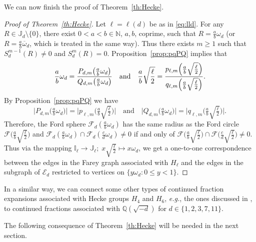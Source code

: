 \documentclass[graybox]{svmult}
\begin{document}
We can now finish the proof of Theorem~\ref{th:Hecke}.

\begin{proof}[Proof of Theorem~\ref{th:Hecke}]
Let $\ell=\ell(d)$ be as in \eqref{eq:lld}. For any $R \in \mathbb J_{d} \setminus \{0\}$, there exist $0 < a < b \in \mathbb N$, $a, b$, coprime, such that $R = \tfrac{a}{b} \omega_d$ (or $R = \tfrac{a}{b}\overline\omega_d$, which is treated in the same way).  Thus there exists $m\ge 1$ such that $S_{d}^{m-1}(R) \ne 0$ and $S_{d}^{m}(R) = 0$.  Proposition~\ref{prop:pqPQ} implies that 
\[
\frac{a}{b} \omega_d  = \frac{P_{d,m}\big(\tfrac{a}{b} \omega_d\big)}{Q_{d,m}\big(\tfrac{a}{b} \omega_d\big)} \quad \hbox{and}\quad 
\frac{a}{b}\sqrt{\frac\ell2} = \frac{p_{\ell,m}\Big(\tfrac{a}{b} \sqrt{\tfrac\ell2}\Big) }{q_{\ell,m}\Big(\tfrac{a}{b} \sqrt{\tfrac\ell2}\Big) }. 
\]
By  Proposition~\ref{prop:pqPQ} we have 
\[
\big|P_{d,m}\big(\tfrac{a}{b} \omega_d\big)\big|=\Big|p_{\ell,m}\Big(\tfrac{a}{b} \sqrt{\tfrac\ell2}\Big)\Big| \quad\text{and}\quad \big|Q_{d,m}\big(\tfrac{a}{b} \omega_d\big)\big|=\Big|q_{\ell,m}\Big(\tfrac{a}{b} \sqrt{\tfrac\ell2}\Big)\Big|.
\]
Therefore, the Ford sphere $\mathcal{F}_{d}\left(\tfrac{a}{b} \omega_d\right)$ has the same radius as the Ford circle $\mathcal{F}\Big(\tfrac{a}{b}\sqrt{\tfrac\ell2}\Big)$  and $\mathcal{F}_{d}\left(\tfrac{a}{b} \omega_d\right) \cap \mathcal{F}_{d}\left(\tfrac{c}{d} \omega_d\right)\not=0$ if and only of $\mathcal{F}\Big(\tfrac{a}{b}\sqrt{\tfrac\ell2}\Big) \cap \mathcal{F}\Big(\tfrac{c}{d}\sqrt{\tfrac\ell2}\Big) \not=0$. Thus via the mapping $\mathbb I_{\ell} \to \mathbb J_\ell;  \; x \sqrt{\tfrac{\ell}{2}} \mapsto x \omega_{d}$, we get a one-to-one correspondence between the edges in the Farey graph associated with $H_\ell$ and the edges in the subgraph of $\mathcal E_{d}$ restricted to vertices on $\{y\omega_{d} : 0 \le y <1\}$.  
\end{proof}

In a similar way, we can connect some other types of continued fraction 
expansions associated with Hecke groups $H_{4}$ and $H_{6}$, {\em e.g.}, the ones discussed in 
\cite{D-K-S,K-S-S,R}, to continued fractions associated with $\mathbb Q(\sqrt{-d})$ for $d\in\{1, 2, 3, 7, 11\}$. 


The following consequence of Theorem~\ref{th:Hecke} will be needed in the next section.
\end{document}
